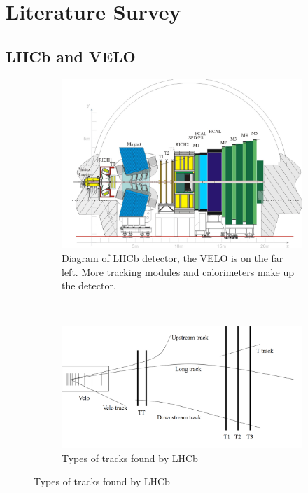 

\chapter{Literature Survey}  %


\graphicspath{{Chapter1/Figs/}}



\section{LHCb and VELO} %

\begin{figure}[h] %
\centering
\begin{subfigure}[t]{0.45\textwidth}
\centering
\includegraphics[width=\textwidth]{LHCbDiagram}
\caption{Diagram of LHCb detector, the VELO is on the far left. More tracking modules and calorimeters make up the detector.} 
\label{fig:LHCbDiagram} 
\end{subfigure}
~
\begin{subfigure}[t]{0.45\textwidth}
\includegraphics[width=\textwidth]{LHCbTracking}
\caption{Types of tracks found by LHCb} 
\label{fig:LHCbTracking}
\end{subfigure}
\end{figure}

